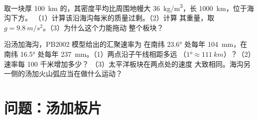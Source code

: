 \begin{exercise}[$\star\star\star$]\label{exo:g11:subduction-zones:14}
取一块厚 \qty{100}{km} 的，其密度平均比周围地幔大
\qty{36}{kg/m^3}，长 \qty{1000}{km}，位于海沟下方。
（1）计算该沿海沟每米的质量过剩。（2）计算
其重量，取 $g = \qty{9.8}{m/s^2}$。（3）为什么这个力能拖动
整个板块？
\end{exercise}

\begin{exercise}[$\star\star\star$]\label{exo:g11:subduction-zones:15}
沿汤加海沟，PB2002 模型给出的汇聚速率为
在南纬 \ang{23.6} 处每年 \qty{104}{mm}，在
南纬 \ang{16.5} 处每年 \qty{237}{mm}。（1）两点沿子午线相距多远
（$\ang{1} \approx \qty{111}{km}$）？（2）速率每 100 千米增加多少？
（3）太平洋板块在两点处的速度
大致相同。海沟另一侧的汤加火山弧应当在做什么运动？
\end{exercise}

\section{问题：汤加板片}

